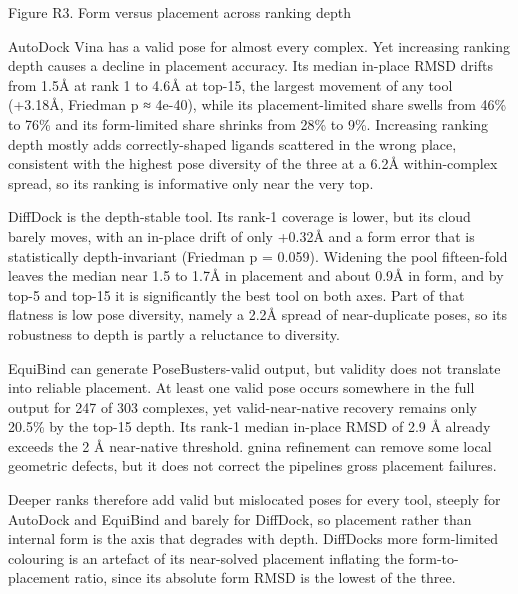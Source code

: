 Figure R3. Form versus placement across ranking depth

AutoDock Vina has a valid pose for almost every complex. Yet increasing ranking depth causes a decline in placement accuracy. Its median in-place RMSD drifts from 1.5Å at rank 1 to 4.6Å at top-15, the largest movement of any tool (+3.18Å, Friedman p ≈ 4e-40), while its placement-limited share swells from 46\% to 76\% and its form-limited share shrinks from 28\% to 9\%. Increasing ranking depth mostly adds correctly-shaped ligands scattered in the wrong place, consistent with the highest pose diversity of the three at a 6.2Å within-complex spread, so its ranking is informative only near the very top.

DiffDock is the depth-stable tool. Its rank-1 coverage is lower, but its cloud barely moves, with an in-place drift of only +0.32Å and a form error that is statistically depth-invariant (Friedman p = 0.059). Widening the pool fifteen-fold leaves the median near 1.5 to 1.7Å in placement and about 0.9Å in form, and by top-5 and top-15 it is significantly the best tool on both axes. Part of that flatness is low pose diversity, namely a 2.2Å spread of near-duplicate poses, so its robustness to depth is partly a reluctance to diversity.

EquiBind can generate PoseBusters-valid output, but validity does not translate into reliable placement. At least one valid pose occurs somewhere in the full output for 247 of 303 complexes, yet valid-near-native recovery remains only 20.5\% by the top-15 depth. Its rank-1 median in-place RMSD of 2.9 Å already exceeds the 2 Å near-native threshold. gnina refinement can remove some local geometric defects, but it does not correct the pipeline\textquotesingle s gross placement failures.

Deeper ranks therefore add valid but mislocated poses for every tool, steeply for AutoDock and EquiBind and barely for DiffDock, so placement rather than internal form is the axis that degrades with depth. DiffDock\textquotesingle s more form-limited colouring is an artefact of its near-solved placement inflating the form-to-placement ratio, since its absolute form RMSD is the lowest of the three.


